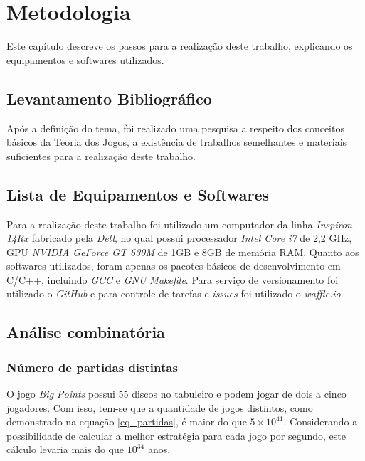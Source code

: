 \chapter[Metodologia]{Metodologia}
\label{cha:metodologia}
	Este capítulo descreve os passos para a realização deste trabalho, explicando os equipamentos e softwares utilizados.

\section{Levantamento Bibliográfico}
\label{sec:levantamento-bibliografico}
Após a definição do tema, foi realizado uma pesquisa a respeito dos conceitos básicos da Teoria dos Jogos, a existência de trabalhos semelhantes e materiais suficientes para a realização deste trabalho.


\section{Lista de Equipamentos e Softwares}
\label{sec:lista-de-equipamentos-e-softwares}

Para a realização deste trabalho foi utilizado um computador da linha \emph{Inspiron 14Rx} fabricado pela \emph{Dell}, no qual possui processador \emph{Intel Core i7} de 2,2 GHz, GPU \emph{NVIDIA GeForce GT 630M} de 1GB e 8GB de memória RAM. Quanto aos softwares utilizados, foram apenas os pacotes básicos de desenvolvimento em C/C++, incluindo \emph{GCC} e \emph{GNU Makefile}. Para serviço de versionamento foi utilizado o \emph{GitHub} e para controle de tarefas e \emph{issues} foi utilizado o \emph{waffle.io}.


\section{Análise combinatória}

\subsection{Número de partidas distintas}
O jogo \emph{Big Points} possui 55 discos no tabuleiro e podem jogar de dois a cinco jogadores. Com isso, tem-se que a quantidade de jogos distintos, como demonstrado na equação \ref{eq_partidas}, é maior do que $5\times 10^{41}$. Considerando a possibilidade de calcular a melhor estratégia para cada jogo por segundo, este cálculo levaria mais do que $10^{34}$ anos.

